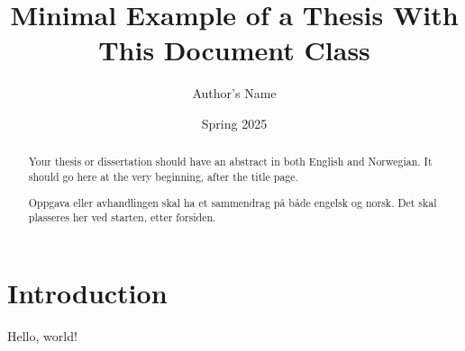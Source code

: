 \documentclass[master]{thesis}
\title{Minimal Example of a Thesis With This Document Class}
\author{Author's Name}
\date{Spring 2025}
\begin{document}
\maketitle

\frontmatter

\begin{abstract}

Your thesis or dissertation should have an abstract in both English and Norwegian. It should go here at the very beginning, after the title page.

\end{abstract}

\begin{otherlanguage}{norsk}
\begin{abstract}

Oppgava eller avhandlingen skal ha et sammendrag på både engelsk og norsk. Det skal plasseres her ved starten, etter forsiden.

\end{abstract}
\end{otherlanguage}

\tableofcontents

\mainmatter

\chapter{Introduction}

Hello, world!
\end{document}
